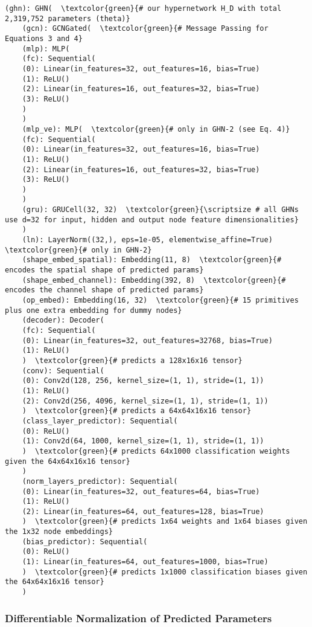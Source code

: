 \begin{small}
	\begin{Verbatim}[commandchars=\\\{\}]
	(ghn): GHN(  \textcolor{green}{# our hypernetwork H_D with total 2,319,752 parameters (theta)}
	(gcn): GCNGated(  \textcolor{green}{# Message Passing for Equations 3 and 4}
	(mlp): MLP(
	(fc): Sequential(
	(0): Linear(in_features=32, out_features=16, bias=True)
	(1): ReLU()
	(2): Linear(in_features=16, out_features=32, bias=True)
	(3): ReLU()
	)
	)
	(mlp_ve): MLP(  \textcolor{green}{# only in GHN-2 (see Eq. 4)}
	(fc): Sequential(
	(0): Linear(in_features=32, out_features=16, bias=True)
	(1): ReLU()
	(2): Linear(in_features=16, out_features=32, bias=True)
	(3): ReLU()
	)
	)
	(gru): GRUCell(32, 32)  \textcolor{green}{\scriptsize # all GHNs use d=32 for input, hidden and output node feature dimensionalities}
	)
	(ln): LayerNorm((32,), eps=1e-05, elementwise_affine=True)  \textcolor{green}{# only in GHN-2}
	(shape_embed_spatial): Embedding(11, 8)  \textcolor{green}{# encodes the spatial shape of predicted params}
	(shape_embed_channel): Embedding(392, 8)  \textcolor{green}{# encodes the channel shape of predicted params}
	(op_embed): Embedding(16, 32)  \textcolor{green}{# 15 primitives plus one extra embedding for dummy nodes}
	(decoder): Decoder(
	(fc): Sequential(
	(0): Linear(in_features=32, out_features=32768, bias=True)
	(1): ReLU()
	)  \textcolor{green}{# predicts a 128x16x16 tensor}
	(conv): Sequential(
	(0): Conv2d(128, 256, kernel_size=(1, 1), stride=(1, 1))
	(1): ReLU()
	(2): Conv2d(256, 4096, kernel_size=(1, 1), stride=(1, 1))
	)  \textcolor{green}{# predicts a 64x64x16x16 tensor}
	(class_layer_predictor): Sequential(
	(0): ReLU()
	(1): Conv2d(64, 1000, kernel_size=(1, 1), stride=(1, 1))
	)  \textcolor{green}{# predicts 64x1000 classification weights given the 64x64x16x16 tensor}
	)
	(norm_layers_predictor): Sequential(
	(0): Linear(in_features=32, out_features=64, bias=True)
	(1): ReLU()
	(2): Linear(in_features=64, out_features=128, bias=True)
	)  \textcolor{green}{# predicts 1x64 weights and 1x64 biases given the 1x32 node embeddings}
	(bias_predictor): Sequential(
	(0): ReLU()
	(1): Linear(in_features=64, out_features=1000, bias=True)
	)  \textcolor{green}{# predicts 1x1000 classification biases given the 64x64x16x16 tensor}
	)
	\end{Verbatim}
\end{small}


\subsubsection{Differentiable Normalization of Predicted Parameters\label{apdx:renorm}}

